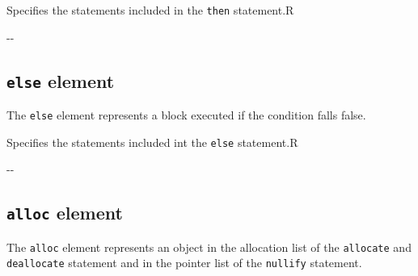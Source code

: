 \begin{XcodeMLChildElements}
{Specifies the statements included in the {\tt then} statement.}{R}
\end{XcodeMLChildElements}

\begin{XcodeMLAttributes}
\XcodeMLAttrDef{-}{-}
{-}{-}
\end{XcodeMLAttributes}


\subsection{ {\tt else} element}

The {\tt else} element represents a block executed if the condition falls false.


\begin{XcodeMLChildElements}
{Specifies the statements included int the {\tt else} statement.}{R}
\end{XcodeMLChildElements}

\begin{XcodeMLAttributes}
\XcodeMLAttrDef{-}{-}
{-}{-}
\end{XcodeMLAttributes}


\subsection{ {\tt alloc} element}

The {\tt alloc} element represents an object in the allocation list of the {\tt allocate}
and {\tt deallocate} statement and in the pointer list of the {\tt nullify} statement.


